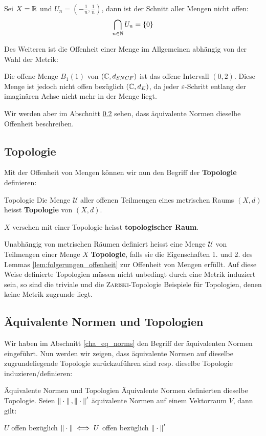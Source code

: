 \begin{example} Sei $X = \mathbb{R}$ und $U_n = (-\frac{1}{n}, \frac{1}{n})$, dann ist der Schnitt aller Mengen nicht offen:
$$\bigcap_{n \in \mathbb{N}} U_n = \{0\}$$
\end{example}

\begin{remark} Des Weiteren ist die Offenheit einer Menge im Allgemeinen abhängig von der Wahl der Metrik:
\begin{example}
Die offene Menge $B_1(1)$ von $(\mathbb{C}, d_{SNCF})$ ist das offene Intervall $(0,2)$. Diese Menge ist jedoch nicht offen bezüglich $(\mathbb{C}, d_E)$, da jeder $\varepsilon$-Schritt entlang der imaginären Achse nicht mehr in der Menge liegt.
\end{example}
Wir werden aber im Abschnitt \ref{cha_eq_norms_topology} sehen, dass äquivalente Normen dieselbe Offenheit beschreiben.
\end{remark}

\subsection{Topologie}
Mit der Offenheit von Mengen können wir nun den Begriff der \textbf{Topologie} definieren:

\begin{definition}{Topologie}{}
Die Menge $\mathcal{U}$ aller offenen Teilmengen eines metrischen Raums $(X,d)$ heisst \textbf{Topologie} von $(X,d)$.

$X$ versehen mit einer Topologie heisst \textbf{topologischer Raum}.
\end{definition}
\begin{remark}
Unabhängig von metrischen Räumen definiert heisst eine Menge $\mathcal{U}$ von Teilmengen einer Menge $X$ \textbf{Topologie}, falls sie die Eigenschaften 1. und 2. des Lemmas \ref{lem:folgerungen_offenheit} zur Offenheit von Mengen erfüllt. Auf diese Weise definierte Topologien müssen nicht unbedingt durch eine Metrik induziert sein, so sind die triviale und die \textsc{Zariski}-Topologie Beispiele für Topologien, denen keine Metrik zugrunde liegt.
\end{remark}

\subsection{Äquivalente Normen und Topologien}\label{cha_eq_norms_topology}
Wir haben im Abschnitt \ref{cha_eq_norms} den Begriff der äquivalenten Normen eingeführt. Nun werden wir zeigen, dass äquivalente Normen auf dieselbe zugrundeliegende Topologie zurückzuführen sind resp. dieselbe Topologie induzieren/definieren:
\begin{lemma}{Äquivalente Normen und Topologien}{}
Äquivalente Normen definierten dieselbe Topologie. Seien $\left\|\:\cdot\:\right\|, \left\|\:\cdot\:\right\|'$ äquivalente Normen auf einem Vektorraum $V$, dann gilt:

\centering $U$ offen bezüglich $\left\|\:\cdot\:\right\| \iff U $ offen bezüglich $\left\|\:\cdot\:\right\|'$
\end{lemma}

